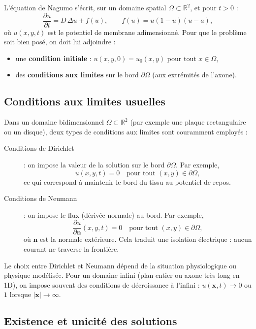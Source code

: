 \documentclass[11pt,a4paper]{report}
\begin{document}
L’équation de Nagumo s’écrit, sur un domaine spatial $\Omega \subset \mathbb{R}^2$, et pour $t > 0$ :
\[
\frac{\partial u}{\partial t} = D\,\Delta u + f(u), \qquad f(u) = u(1-u)(u-a),
\]
où $u(x,y,t)$ est le potentiel de membrane adimensionné. Pour que le problème soit bien posé, on doit lui adjoindre :
\begin{itemize}
  \item une \textbf{condition initiale} : $u(x,y,0) = u_0(x,y)$ pour tout $x \in \Omega$,
  \item des \textbf{conditions aux limites} sur le bord $\partial\Omega$ (aux extrémités de l’axone).
\end{itemize}

\subsection*{Conditions aux limites usuelles}

Dans un domaine bidimensionnel \(\Omega \subset \mathbb{R}^2\) (par exemple une plaque rectangulaire ou un disque), deux types de conditions aux limites sont couramment employés :

\begin{description}
  \item[Conditions de Dirichlet] : on impose la valeur de la solution sur le bord \(\partial\Omega\). Par exemple,
  \[
  u(x,y,t) = 0 \quad \text{pour tout } (x,y) \in \partial\Omega,
  \]
  ce qui correspond à maintenir le bord du tissu au potentiel de repos.
  
  \item[Conditions de Neumann] : on impose le flux (dérivée normale) au bord. Par exemple,
  \[
  \frac{\partial u}{\partial \mathbf{n}}(x,y,t) = 0 \quad \text{pour tout } (x,y) \in \partial\Omega,
  \]
  où \(\mathbf{n}\) est la normale extérieure. Cela traduit une isolation électrique : aucun courant ne traverse la frontière.
\end{description}

Le choix entre Dirichlet et Neumann dépend de la situation physiologique ou physique modélisée. Pour un domaine infini (plan entier ou axone très long en 1D), on impose souvent des conditions de décroissance à l’infini : \(u(\mathbf{x},t) \to 0\) ou \(1\) lorsque \(|\mathbf{x}| \to \infty\).

\subsection*{Existence et unicité des solutions}
\end{document}
